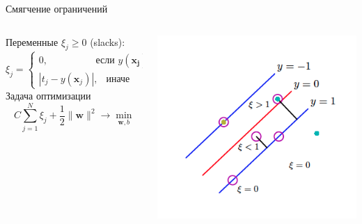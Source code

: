 \documentclass[10pt,a4paper]{beamer}
\begin{document}

\begin{frame}{Смягчение ограничений}

\begin{columns}[T]
    \begin{column}{.51\textwidth}
    
    Переменные $\xi_j \geq 0$ (slacks):
    \[
    \xi_j = \begin{cases}
    0, \quad\quad\quad\quad\;\;\text{ если }y(\mathbf{x_j}) t_j \geq 1  \\
    |t_j - y(\mathbf{x}_j)|, \;\,\text{ иначе}
    \end{cases}
    \]
    Задача оптимизации
    \[
    C \sum_{j=1}^N \xi_j + \frac{1}{2}\|\mathbf{w}\|^2 \rightarrow \min_{\mathbf{w}, b}
    \]
	
    \end{column}
       
    \begin{column}{.5\textwidth}
    	\vspace{-1em}
		\begin{center}
   			\includegraphics[scale=0.45]{images/slack.png}
    	\end{center}
	\end{column}
\end{columns}
  
\end{frame}

\end{document}
